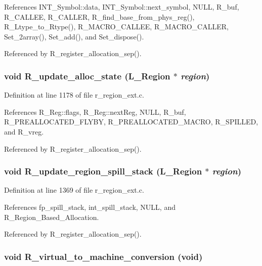 References INT\_\-Symbol::data, INT\_\-Symbol::next\_\-symbol, NULL, R\_\-buf, R\_\-CALLEE, R\_\-CALLER, R\_\-find\_\-base\_\-from\_\-phys\_\-reg(), R\_\-Ltype\_\-to\_\-Rtype(), R\_\-MACRO\_\-CALLEE, R\_\-MACRO\_\-CALLER, Set\_\-2array(), Set\_\-add(), and Set\_\-dispose().

Referenced by R\_\-register\_\-allocation\_\-sep().
\subsubsection{\setlength{\rightskip}{0pt plus 5cm}void R\_\-update\_\-alloc\_\-state (L\_\-Region $\ast$ {\em region})}\label{r__regproto_8h_6a0ee77089a5232a8042520d0c5955f5}




Definition at line 1178 of file r\_\-region\_\-ext.c.

References R\_\-Reg::flags, R\_\-Reg::next\-Reg, NULL, R\_\-buf, R\_\-PREALLOCATED\_\-FLYBY, R\_\-PREALLOCATED\_\-MACRO, R\_\-SPILLED, and R\_\-vreg.

Referenced by R\_\-register\_\-allocation\_\-sep().
\subsubsection{\setlength{\rightskip}{0pt plus 5cm}void R\_\-update\_\-region\_\-spill\_\-stack (L\_\-Region $\ast$ {\em region})}\label{r__regproto_8h_376c0fc08f9541f468b4c94694481c9d}




Definition at line 1369 of file r\_\-region\_\-ext.c.

References fp\_\-spill\_\-stack, int\_\-spill\_\-stack, NULL, and R\_\-Region\_\-Based\_\-Allocation.

Referenced by R\_\-register\_\-allocation\_\-sep().
\subsubsection{\setlength{\rightskip}{0pt plus 5cm}void R\_\-virtual\_\-to\_\-machine\_\-conversion (void)}\label{r__regproto_8h_efdb477fe2fdbfe172b1e38da10b2279}




